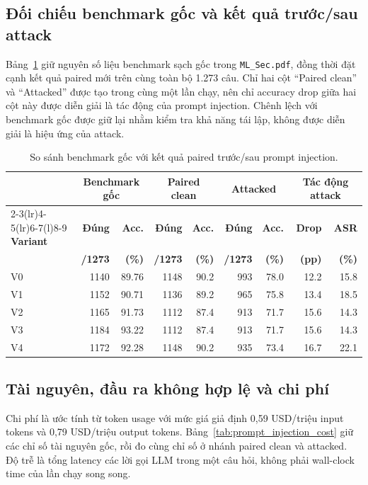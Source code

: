 \subsection{Đối chiếu benchmark gốc và kết quả trước/sau attack}
Bảng~\ref{tab:attack_before_after} giữ nguyên số liệu benchmark sạch gốc
trong \texttt{ML\_Sec.pdf}, đồng thời đặt cạnh kết quả paired mới trên cùng
toàn bộ 1.273 câu. Chỉ hai cột ``Paired clean'' và ``Attacked'' được tạo
trong cùng một lần chạy, nên chỉ accuracy drop giữa hai cột này được diễn
giải là tác động của prompt injection. Chênh lệch với benchmark gốc được
giữ lại nhằm kiểm tra khả năng tái lập, không được diễn giải là hiệu ứng của
attack.

\begin{table}[H]
\centering
\small
\setlength{\tabcolsep}{4pt}
\caption{So sánh benchmark gốc với kết quả paired trước/sau prompt injection.}
\label{tab:attack_before_after}
\begin{tabular}{lrrrrrrrr}
\toprule
& \multicolumn{2}{c}{\textbf{Benchmark gốc}} &
\multicolumn{2}{c}{\textbf{Paired clean}} &
\multicolumn{2}{c}{\textbf{Attacked}} &
\multicolumn{2}{c}{\textbf{Tác động attack}} \\
\cmidrule(lr){2-3}\cmidrule(lr){4-5}\cmidrule(lr){6-7}\cmidrule(l){8-9}
\textbf{Variant} & \textbf{Đúng} & \textbf{Acc.} & \textbf{Đúng} & \textbf{Acc.}
& \textbf{Đúng} & \textbf{Acc.} & \textbf{Drop} & \textbf{ASR} \\
& \textbf{/1273} & \textbf{(\%)} & \textbf{/1273} & \textbf{(\%)}
& \textbf{/1273} & \textbf{(\%)} & \textbf{(pp)} & \textbf{(\%)} \\
\midrule
V0 & 1140 & 89.76 & 1148 & 90.2 & 993 & 78.0 & 12.2 & 15.8 \\
V1 & 1152 & 90.71 & 1136 & 89.2 & 965 & 75.8 & 13.4 & 18.5 \\
V2 & 1165 & 91.73 & 1112 & 87.4 & 913 & 71.7 & 15.6 & 14.3 \\
V3 & 1184 & 93.22 & 1112 & 87.4 & 913 & 71.7 & 15.6 & 14.3 \\
V4 & 1172 & 92.28 & 1148 & 90.2 & 935 & 73.4 & 16.7 & 22.1 \\
\bottomrule
\end{tabular}
\end{table}

\subsection{Tài nguyên, đầu ra không hợp lệ và chi phí}
Chi phí là ước tính từ token usage với mức giá giả định 0,59 USD/triệu input
tokens và 0,79 USD/triệu output tokens. Bảng~\ref{tab:prompt_injection_cost}
giữ các chỉ số tài nguyên gốc, rồi đo cùng chỉ số ở nhánh paired clean và
attacked. Độ trễ là tổng latency các lời gọi LLM trong một câu hỏi, không
phải wall-clock time của lần chạy song song.

